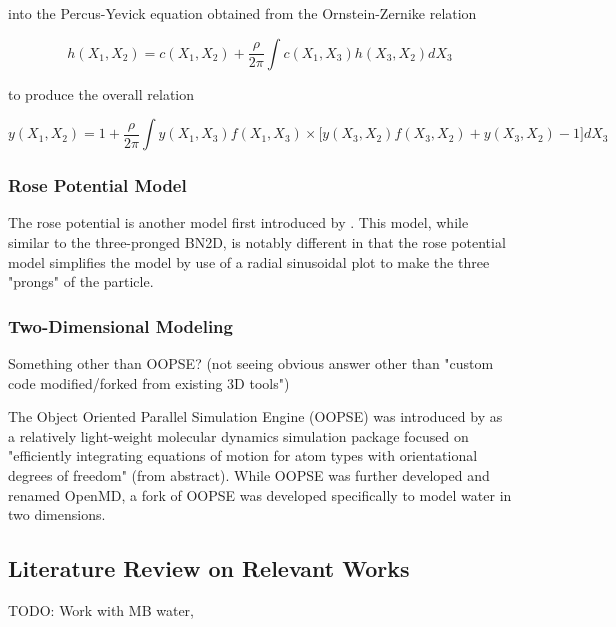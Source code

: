 into the Percus-Yevick equation obtained from the Ornstein-Zernike relation 

\begin{equation}
h(X_{1}, X_{2}) = c(X_{1}, X_{2}) + \frac{\rho}{2\pi}\int c(X_{1}, X_{3}) h(X_{3}, X_{2})dX_{3}
\end{equation}

to produce the overall relation

\begin{equation}
y(X_{1}, X_{2}) = 1 + \frac{\rho}{2\pi}\int y(X_{1}, X_{3})f(X_{1}, X_{3}) \times \Big[ y(X_{3}, X_{2})f(X_{3}, X_{2}) + y(X_{3}, X_{2}) - 1 \Big] dX_{3}
\end{equation}


\subsubsection{Rose Potential Model}

The rose potential is another model first introduced by \cite{RoseOG}.
This model, while similar to the three-pronged BN2D, is notably different in that the rose potential model simplifies the model by use of a radial sinusoidal plot to make the three "prongs" of the particle. 

\subsubsection{Two-Dimensional Modeling}

Something other than OOPSE? (not seeing obvious answer other than "custom code modified/forked from existing 3D tools")

The Object Oriented Parallel Simulation Engine (OOPSE) was introduced by \cite{OOPSE} as a relatively light-weight molecular dynamics simulation package focused on "efficiently integrating equations of motion for atom types with orientational degrees of freedom" (from abstract).
While OOPSE was further developed and renamed OpenMD, a fork of OOPSE was developed specifically to model water in two dimensions.

\subsection{Literature Review on Relevant Works}

TODO:
Work with MB water,





